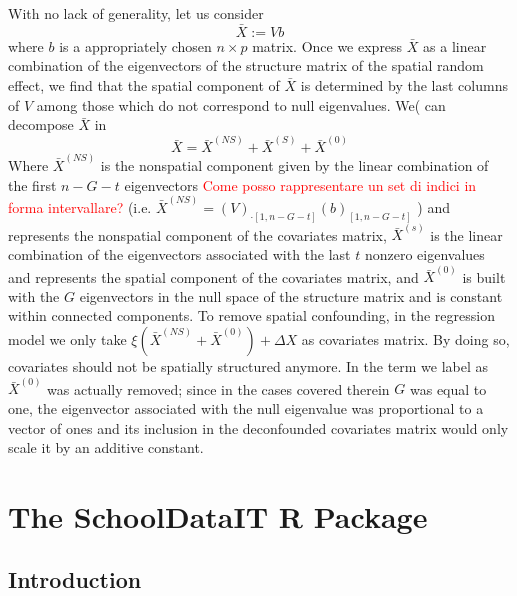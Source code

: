 \documentclass[openany]{book}
\begin{document}
With no lack of generality, let us consider
$$
\bar{X} := Vb
$$ where $b$ is a appropriately chosen $n \times p$ matrix. Once we express $\bar{X}$ as a linear combination of the eigenvectors of the structure matrix of the spatial random effect, we find that the spatial component of $\bar{X}$ is determined by the last columns of $V$ among those which do not correspond to null eigenvalues. We( can decompose $\bar{X}$ in
$$
\bar{X} = \bar{X}^{(NS)} + \bar{X}^{(S)} + \bar{X}^{(0)}
$$
Where $\bar{X}^{(NS)}$ is the nonspatial component given by the linear combination of the first $n-G-t$ eigenvectors \textcolor{red}{Come posso rappresentare un set di indici in forma intervallare?} (i.e. $\bar{X}^{(NS)} = (V)_{\cdot[1, n-G-t]}(b)_{[1, n-G-t]}$ ) and represents the nonspatial component of the covariates matrix, $\bar{X}^{(s)}$ is the linear combination of the eigenvectors associated with the last $t$ nonzero eigenvalues and represents the spatial component of the covariates matrix, and $\bar{X}^{(0)}$ is built with the $G$ eigenvectors in the null space of the structure matrix and is constant within connected components. To remove spatial confounding, in the regression model we only take $\xi \left(\bar{X}^{(NS)} + \bar{X}^{(0)}\right) + \Delta X$ as covariates matrix. By doing so, covariates should not be spatially structured anymore. In \cite{Urdangarin24} the term we label as $\bar{X}^{(0)}$ was actually removed; since in the cases covered therein $G$ was equal to one, the eigenvector associated with the null eigenvalue was proportional to a vector of ones and its inclusion in the deconfounded covariates matrix would only scale it by an additive constant.



%
%

%
\chapter{The SchoolDataIT R Package} \label{chapter:SchoolDataIT}
\section{Introduction} \label{section:SchoolDataIT:intro}
\end{document}
